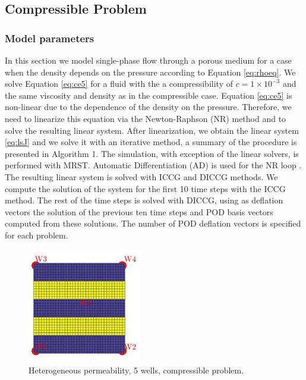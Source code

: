 \documentclass[12pt]{article}
\begin{document}
\newpage
\subsection{Compressible Problem}
\subsubsection{Model parameters}

In this section we model single-phase flow through a porous medium for a case when the density depends on the pressure 
according to Equation \eqref{eq:rhoeq}. We solve Equation \eqref{eq:ce5} for a fluid with the a compressibility of $c= 1 \times 10^{-3}$ and the same viscosity and density as in the compressible case.
Equation \eqref{eq:ce5} is non-linear due to the dependence of the density on the pressure. Therefore, we need to 
linearize this equation via the Newton-Raphson (NR) method and to solve the resulting linear system. After linearization, we obtain the linear system \eqref{eq:lsJ} and we solve it with an iterative method, a summary of the procedure is presented in Algorithm 1. The simulation, with exception of the linear solvers, is performed with MRST. Automatic Differentiation (AD) is used for the NR loop \cite{Lie13}. The resulting linear system is solved with ICCG and DICCG methods. We compute the solution of the system for the first 10 time steps with the ICCG method. The rest of the time steps is solved with DICCG, using as deflation vectors the solution of the previous ten time steps and POD basis vectors computed from these solutions. The number of POD deflation vectors is specified for each problem. \\
\begin{figure}
\centering 
\vspace{-20pt}
\includegraphics[width=5cm,height=5cm,keepaspectratio]{images_prev/perm_comp.jpg}
 \vspace{-15pt}
\caption{ Heterogeneous permeability, 5 wells, compressible problem.}\label{fig:pc}
\vspace{-10pt}
\end{figure} 
\end{document}
